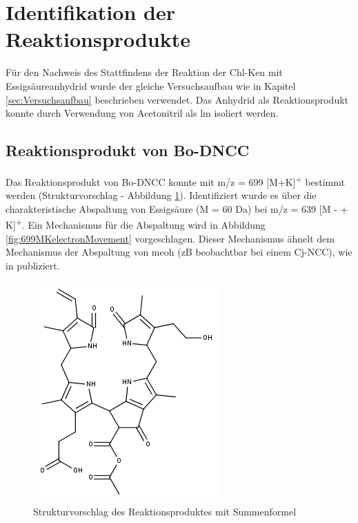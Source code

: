 \section{Identifikation der Reaktionsprodukte} \label{sec:RPMSLeafspray}

Für den Nachweis des Stattfindens der Reaktion der \gls{Chl-K}en mit Essigsäureanhydrid wurde der gleiche Versuchsaufbau wie in Kapitel \ref{sec:Versuchsaufbau} beschrieben verwendet. Das Anhydrid als Reaktionsprodukt konnte durch Verwendung von Acetonitril als \gls{lm} isoliert werden.  

\subsection{Reaktionsprodukt von Bo-DNCC}

Das Reaktionsprodukt von Bo-DNCC konnte mit m/z = 699 [M+K]\textsuperscript{+} bestimmt werden (Strukturvorschlag - Abbildung \ref{fig:699MKstructure}). Identifiziert wurde es über die charakteristische Abspaltung von Essigsäure (M = 60 Da) bei m/z = 639 [M -  + K]\textsuperscript{+}. Ein Mechanismus für die Abspaltung wird in Abbildung \ref{fig:699MKelectronMovement} vorgeschlagen. Dieser Mechanismus ähnelt dem Mechanismus der Abspaltung von \gls{meoh} (\gls{zB} beobachtbar bei einem Cj-NCC), wie in \cite{StructureElucidation} publiziert.\\

\begin{figure}[!htbp]
  \centering
  \includegraphics[scale=0.6]{figures/Kapitel4/Kataboliten/fragmentation_structures/VWA_Katabolit_699.png}
  \caption[Strukturvorschlag des Reaktionsproduktes von Bo-DNCC, Quelle: Autor]{Strukturvorschlag des Reaktionsproduktes mit Summenformel }
  \label{fig:699MKstructure}
\end{figure}

